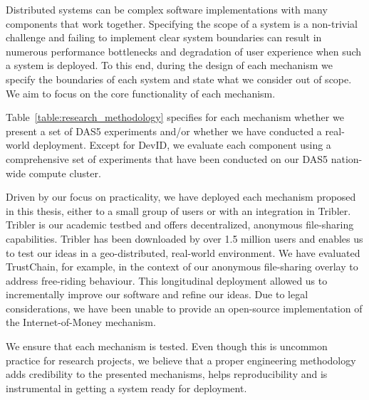 Distributed systems can be complex software implementations with many components that work together.
Specifying the scope of a system is a non-trivial challenge and failing to implement clear system boundaries can result in numerous performance bottlenecks and degradation of user experience when such a system is deployed.
To this end, during the design of each mechanism we specify the boundaries of each system and state what we consider out of scope.
We aim to focus on the core functionality of each mechanism.

Table~\ref{table:research_methodology} specifies for each mechanism whether we present a set of DAS5 experiments and/or whether we have conducted a real-world deployment.
Except for DevID, we evaluate each component using a comprehensive set of experiments that have been conducted on our DAS5 nation-wide compute cluster.

Driven by our focus on practicality, we have deployed each mechanism proposed in this thesis, either to a small group of users or with an integration in Tribler.
Tribler is our academic testbed and offers decentralized, anonymous file-sharing capabilities.
Tribler has been downloaded by over 1.5 million users and enables us to test our ideas in a geo-distributed, real-world environment.
We have evaluated TrustChain, for example, in the context of our anonymous file-sharing overlay to address free-riding behaviour.
This longitudinal deployment allowed us to incrementally improve our software and refine our ideas.
Due to legal considerations, we have been unable to provide an open-source implementation of the Internet-of-Money mechanism.

We ensure that each mechanism is tested.
Even though this is uncommon practice for research projects, we believe that a proper engineering methodology adds credibility to the presented mechanisms, helps reproducibility and is instrumental in getting a system ready for deployment.




